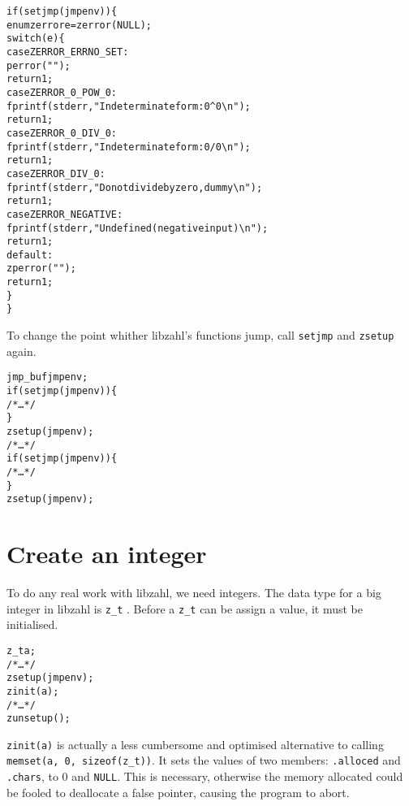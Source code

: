 \begin{alltt}
   \textcolor{c}{if (setjmp(jmpenv)) \{}
       enum zerror e = zerror(NULL);
       switch (e) \{
       case ZERROR_ERRNO_SET:
           perror("");
           \textcolor{c}{return 1;}
       case ZERROR_0_POW_0:
           fprintf(stderr, "Indeterminate form: 0^0\verb|\|n");
           \textcolor{c}{return 1;}
       case ZERROR_0_DIV_0:
           fprintf(stderr, "Indeterminate form: 0/0\verb|\|n");
           \textcolor{c}{return 1;}
       case ZERROR_DIV_0:
           fprintf(stderr, "Do not divide by zero, dummy\verb|\|n");
           \textcolor{c}{return 1;}
       case ZERROR_NEGATIVE:
           fprintf(stderr, "Undefined (negative input)\verb|\|n");
           \textcolor{c}{return 1;}
       default:
           zperror("");
           \textcolor{c}{return 1;}
       \}
   \textcolor{c}{\}}
\end{alltt}

To change the point whither libzahl's functions
jump, call {\tt setjmp} and {\tt zsetup} again.

\begin{alltt}
   jmp_buf jmpenv;
   if (setjmp(jmpenv)) \{
       \textcolor{c}{/* \textrm{\ldots} */}
   \}
   zsetup(jmpenv);
   \textcolor{c}{/* \textrm{\ldots} */}
   if (setjmp(jmpenv)) \{
       \textcolor{c}{/* \textrm{\ldots} */}
   \}
   zsetup(jmpenv);
\end{alltt}


\newpage
\section{Create an integer}
\label{sec:Create an integer}

To do any real work with libzahl, we need integers. The
data type for a big integer in libzahl is {\tt z\_t}
. Before a {\tt z\_t}
can be assign a value, it must be initialised.

\begin{alltt}
   z_t a;
   \textcolor{c}{/* \textrm{\ldots} */
   zsetup(jmpenv);}
   zinit(a);
   \textcolor{c}{/* \textrm{\ldots} */
   zunsetup();}
\end{alltt}

\noindent
{\tt zinit(a)} is actually a less cumbersome and optimised
alternative to calling {\tt memset(a, 0, sizeof(z\_t))}.
It sets the values of two members: {\tt .alloced} and
{\tt .chars}, to 0 and {\tt NULL}. This is necessary,
otherwise the memory allocated could be fooled to deallocate
a false pointer, causing the program to abort.

